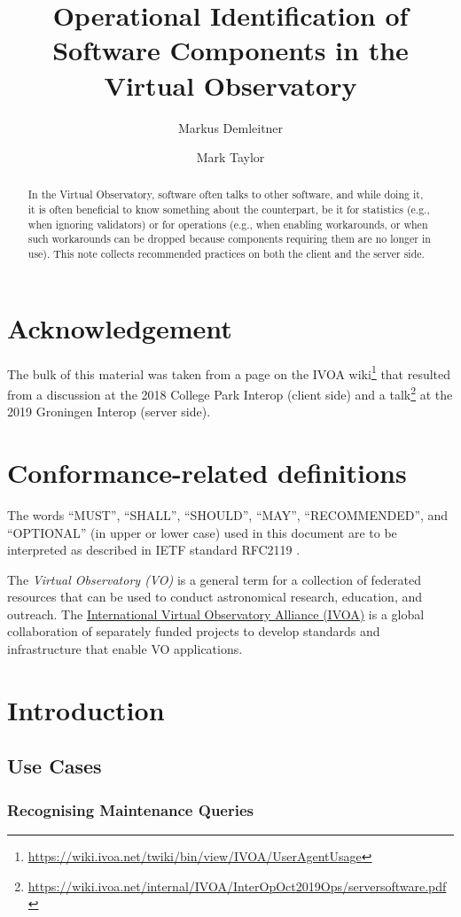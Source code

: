 \documentclass[11pt,a4paper]{ivoa}
\title{Operational Identification of Software Components in the Virtual
Observatory}
\author[https://wiki.ivoa.net/twiki/bin/view/IVOA/WebHome?topic=MarkusDemleitner]{Markus
Demleitner}
\author[https://wiki.ivoa.net/twiki/bin/view/IVOA/MarkusDemleitner?topic=MarkTaylor]{Mark
Taylor}
\begin{document}
\begin{abstract}
In the Virtual Observatory, software often talks to other software, and
while doing it, it is often beneficial to know something about the
counterpart, be it for statistics (e.g., when ignoring validators) or
for operations (e.g., when enabling workarounds, or when such
workarounds can be dropped because components requiring them are no
longer in use).  This note collects recommended practices on both the
client and the server side.
\end{abstract}

\section*{Acknowledgement}

The bulk of this material was taken from a page on the IVOA
wiki\footnote{\url{https://wiki.ivoa.net/twiki/bin/view/IVOA/UserAgentUsage}}
that resulted from a discussion at the 2018 College Park Interop (client
side) and a
talk\footnote{\url{https://wiki.ivoa.net/internal/IVOA/InterOpOct2019Ops/serversoftware.pdf}}
at the 2019 Groningen Interop (server side).


\section*{Conformance-related definitions}

The words ``MUST'', ``SHALL'', ``SHOULD'', ``MAY'', ``RECOMMENDED'', and
``OPTIONAL'' (in upper or lower case) used in this document are to be
interpreted as described in IETF standard RFC2119 \citep{std:RFC2119}.

The \emph{Virtual Observatory (VO)} is a
general term for a collection of federated resources that can be used
to conduct astronomical research, education, and outreach.
The \href{http://www.ivoa.net}{International
Virtual Observatory Alliance (IVOA)} is a global
collaboration of separately funded projects to develop standards and
infrastructure that enable VO applications.


\section{Introduction}


\subsection{Use Cases}

\subsubsection{Recognising Maintenance Queries}
\end{document}
